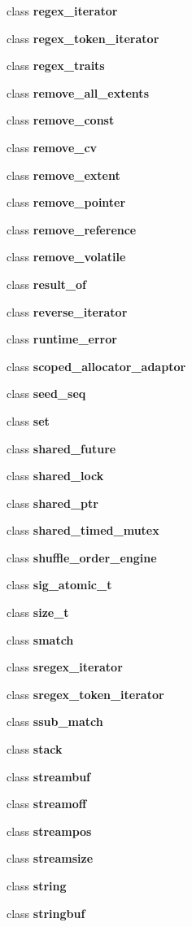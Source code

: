 \begin{DoxyCompactItemize}
\item 
class {\bf regex\+\_\+iterator}
\item 
class {\bf regex\+\_\+token\+\_\+iterator}
\item 
class {\bf regex\+\_\+traits}
\item 
class {\bf remove\+\_\+all\+\_\+extents}
\item 
class {\bf remove\+\_\+const}
\item 
class {\bf remove\+\_\+cv}
\item 
class {\bf remove\+\_\+extent}
\item 
class {\bf remove\+\_\+pointer}
\item 
class {\bf remove\+\_\+reference}
\item 
class {\bf remove\+\_\+volatile}
\item 
class {\bf result\+\_\+of}
\item 
class {\bf reverse\+\_\+iterator}
\item 
class {\bf runtime\+\_\+error}
\item 
class {\bf scoped\+\_\+allocator\+\_\+adaptor}
\item 
class {\bf seed\+\_\+seq}
\item 
class {\bf set}
\item 
class {\bf shared\+\_\+future}
\item 
class {\bf shared\+\_\+lock}
\item 
class {\bf shared\+\_\+ptr}
\item 
class {\bf shared\+\_\+timed\+\_\+mutex}
\item 
class {\bf shuffle\+\_\+order\+\_\+engine}
\item 
class {\bf sig\+\_\+atomic\+\_\+t}
\item 
class {\bf size\+\_\+t}
\item 
class {\bf smatch}
\item 
class {\bf sregex\+\_\+iterator}
\item 
class {\bf sregex\+\_\+token\+\_\+iterator}
\item 
class {\bf ssub\+\_\+match}
\item 
class {\bf stack}
\item 
class {\bf streambuf}
\item 
class {\bf streamoff}
\item 
class {\bf streampos}
\item 
class {\bf streamsize}
\item 
class {\bf string}
\item 
class {\bf stringbuf}

\end{DoxyCompactItemize}
